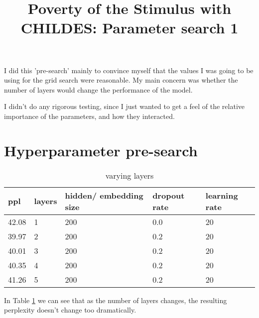 \documentclass{article}
\title{Poverty of the Stimulus with CHILDES: Parameter search 1}
\date{}
\begin{document}
\maketitle

I did this 'pre-search' mainly to convince myself that the values I was going to be using for the grid search were reasonable. My main concern was whether the number of layers would change the performance of the model. 

I didn't do any rigorous testing, since I just wanted to get a feel of the relative importance of the parameters, and how they interacted. 


\section{Hyperparameter pre-search}

\begin{table}[]
\centering
\begin{tabular}{@{}lllll@{}}
\toprule
ppl   & layers & hidden/ embedding size & dropout rate & learning rate \\ \midrule
42.08 & 1      & 200                    & 0.0          & 20            \\
39.97 & 2      & 200                    & 0.2          & 20            \\
40.01 & 3      & 200                    & 0.2          & 20            \\
40.35 & 4      & 200                    & 0.2          & 20            \\
41.26 & 5      & 200                    & 0.2          & 20            \\ \bottomrule
\end{tabular}
\caption{varying layers}
\label{Table.1}
\end{table}


In Table \ref{Table.1} we can see that as the number of layers changes, the resulting perplexity doesn't change too dramatically. 
\end{document}
